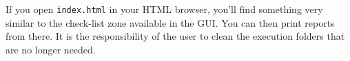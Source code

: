 If you open \texttt{index.html} in your HTML
browser, you'll find something very similar to the check-list zone
available in the GUI. You can then print reports from there. It is the
responsibility of the user to clean the execution folders
that are no longer needed.


